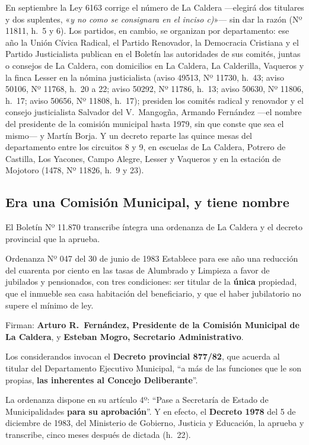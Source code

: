 En septiembre la Ley 6163 corrige el número de La Caldera ---elegirá dos titulares y dos suplentes, «\textit{y no como se consignara en el inciso c)}»--- sin dar la razón (Nº 11811, h.\ 5 y 6). Los partidos, en cambio, se organizan por departamento: ese año la Unión Cívica Radical, el Partido Renovador, la Democracia Cristiana y el Partido Justicialista publican en el Boletín las autoridades de sus comités, juntas o consejos de La Caldera, con domicilios en La Caldera, La Calderilla, Vaqueros y la finca Lesser en la nómina justicialista (aviso 49513, Nº 11730, h.\ 43; aviso 50106, Nº 11768, h.\ 20 a 22; aviso 50292, Nº 11786, h.\ 13; aviso 50630, Nº 11806, h.\ 17; aviso 50656, Nº 11808, h.\ 17); presiden los comités radical y renovador y el consejo justicialista Salvador del V.\ Mangogña, Armando Fernández ---el nombre del presidente de la comisión municipal hasta 1979, sin que conste que sea el mismo--- y Martín Borja. Y un decreto reparte las quince mesas del departamento entre los circuitos 8 y 9, en escuelas de La Caldera, Potrero de Castilla, Los Yacones, Campo Alegre, Lesser y Vaqueros y en la estación de Mojotoro (1478, Nº 11826, h.\ 9 y 23).

\subsection*{Era una Comisión Municipal, y tiene nombre}

El Boletín Nº 11.870 transcribe íntegra una ordenanza de La Caldera y el decreto provincial que la aprueba.

\begin{ficha}{Ordenanza Nº 047 del 30 de junio de 1983}
Establece para ese año una reducción del cuarenta por ciento en las tasas de Alumbrado y Limpieza a favor de jubilados y pensionados, con tres condiciones: ser titular de la \textbf{única} propiedad, que el inmueble sea casa habitación del beneficiario, y que el haber jubilatorio no supere el mínimo de ley.

Firman: \textbf{Arturo R.\ Fernández, Presidente de la Comisión Municipal de La Caldera}, y \textbf{Esteban Mogro, Secretario Administrativo}.

Los considerandos invocan el \textbf{Decreto provincial 877/82}, que acuerda al titular del Departamento Ejecutivo Municipal, ``a más de las funciones que le son propias, \textbf{las inherentes al Concejo Deliberante}''.

La ordenanza dispone en su artículo 4º: ``Pase a Secretaría de Estado de Municipalidades \textbf{para su aprobación}''. Y en efecto, el \textbf{Decreto 1978} del 5 de diciembre de 1983, del Ministerio de Gobierno, Justicia y Educación, la aprueba y transcribe, cinco meses después de dictada (h.\ 22).
\end{ficha}

